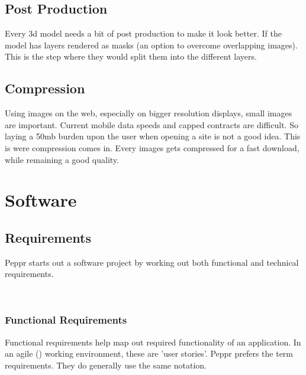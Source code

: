 \subsection{Post Production}
Every 3d model needs a bit of post production to make it look better. If the model has layers rendered as masks (an option to overcome overlapping images). This is the step where they would split them into the different layers.
\subsection{Compression}
Using images on the web, especially on bigger resolution displays, small images are important. Current mobile data speeds and capped contracts are difficult. So laying a 50mb burden upon the user when opening a site is not a good idea. This is were compression comes in. Every images gets compressed for a fast download, while remaining a good quality.
\section{Software}

\subsection{Requirements}
Peppr starts out a software project by working out both functional and technical requirements.

​
\subsubsection{Functional Requirements}
Functional requirements help map out required functionality of an application. In an agile (\citet{Agile: User Stories}) working environment, these are 'user stories'. Peppr prefers the term requirements. They do generally use the same notation. \newline

